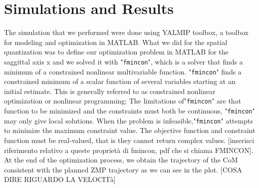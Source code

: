 \documentclass[a4paper]{article}
\begin{document}
\section{Simulations and Results}
The simulation that we performed were done using YALMIP toolbox, a toolbox for modeling and optimization in MATLAB. 
What we did for the spatial quantization was to define our optimization problem in MATLAB for the saggittal axis x and we solved it  with "\verb+fmincon+", which is a solver that finds a minimum of a constrained nonlinear multivariable function.
"\verb+fmincon+" finds a constrained minimum of a scalar function of several variables starting at an initial estimate. This is generally referred to as constrained nonlinear optimization or nonlinear programming; The limitations of"\verb+fmincon+" are that function to be minimized and the constraints must both be continuous, "\verb+fmincon+" may only give local solutions.
When the problem is infeasible,"\verb+fmincon+" attempts to minimize the maximum constraint value.
The objective function and constraint function must be real-valued, that is they cannot return complex values. [inserisci riferimento relativo a queste proprietà di fmincon, pdf che si chiama FMINCON]. At the end of the optimization process, we obtain the trajectory of the CoM consistent with the planned ZMP trajectory as we can see in the plot.
[COSA DIRE RIGUARDO LA VELOCITà]
\end{document}
